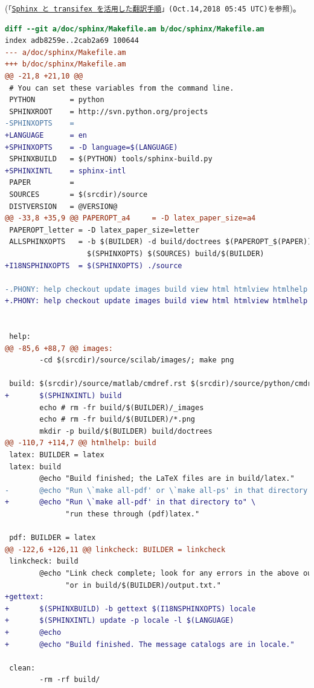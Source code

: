 \documentclass{../../style/ltjoc}
\begin{document}
(\texttt{「\href{http://www.turbare.net/weblog/workflow-with-transifex-and-sphinx.html}{Sphinx と transifex を活用した翻訳手順}」(Oct.14,2018 05:45 UTC)を参照})。
\begin{lstlisting}[language=diff]
diff --git a/doc/sphinx/Makefile.am b/doc/sphinx/Makefile.am
index adb8259e..2cab2a69 100644
--- a/doc/sphinx/Makefile.am
+++ b/doc/sphinx/Makefile.am
@@ -21,8 +21,10 @@
 # You can set these variables from the command line.
 PYTHON        = python
 SPHINXROOT    = http://svn.python.org/projects
-SPHINXOPTS    =
+LANGUAGE      = en
+SPHINXOPTS    = -D language=$(LANGUAGE)
 SPHINXBUILD   = $(PYTHON) tools/sphinx-build.py
+SPHINXINTL    = sphinx-intl
 PAPER         =
 SOURCES       = $(srcdir)/source
 DISTVERSION   = @VERSION@
@@ -33,8 +35,9 @@ PAPEROPT_a4     = -D latex_paper_size=a4
 PAPEROPT_letter = -D latex_paper_size=letter
 ALLSPHINXOPTS   = -b $(BUILDER) -d build/doctrees $(PAPEROPT_$(PAPER)) \
                   $(SPHINXOPTS) $(SOURCES) build/$(BUILDER)
+I18NSPHINXOPTS  = $(SPHINXOPTS) ./source

-.PHONY: help checkout update images build view html htmlview htmlhelp latex pdf linkcheck clean upload
+.PHONY: help checkout update images build view html htmlview htmlhelp latex pdf linkcheck clean upload gettext


 help:
@@ -85,6 +88,7 @@ images:
        -cd $(srcdir)/source/scilab/images/; make png

 build: $(srcdir)/source/matlab/cmdref.rst $(srcdir)/source/python/cmdref.rst $(srcdir)/source/scilab/cmdref.rst checkout images
+       $(SPHINXINTL) build
        echo # rm -fr build/$(BUILDER)/_images
        echo # rm -fr build/$(BUILDER)/*.png
        mkdir -p build/$(BUILDER) build/doctrees
@@ -110,7 +114,7 @@ htmlhelp: build
 latex: BUILDER = latex
 latex: build
        @echo "Build finished; the LaTeX files are in build/latex."
-       @echo "Run \`make all-pdf' or \`make all-ps' in that directory to" \
+       @echo "Run \`make all-pdf' in that directory to" \
              "run these through (pdf)latex."

 pdf: BUILDER = latex
@@ -122,6 +126,11 @@ linkcheck: BUILDER = linkcheck
 linkcheck: build
        @echo "Link check complete; look for any errors in the above output " \
              "or in build/$(BUILDER)/output.txt."
+gettext:
+       $(SPHINXBUILD) -b gettext $(I18NSPHINXOPTS) locale
+       $(SPHINXINTL) update -p locale -l $(LANGUAGE)
+       @echo
+       @echo "Build finished. The message catalogs are in locale."

 clean:
        -rm -rf build/
\end{lstlisting}
\end{document}
